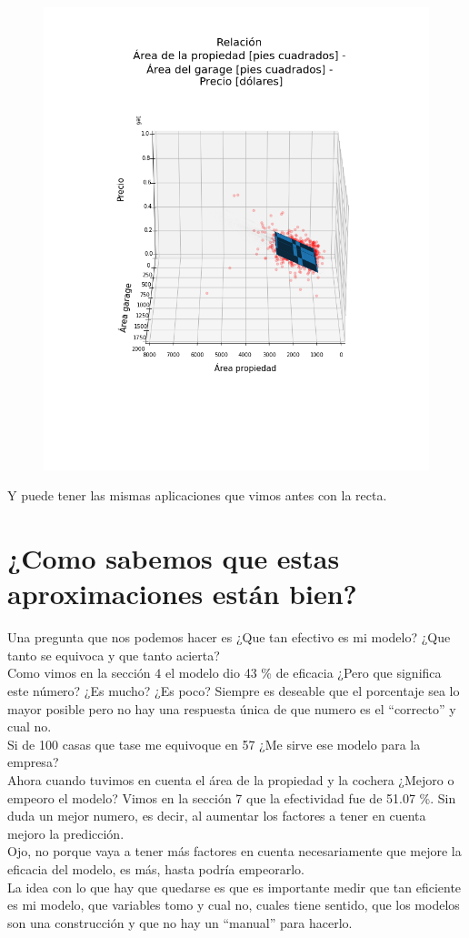 \documentclass{article}
\begin{document}
\begin{figure}[h!]
\includegraphics[scale=0.5]{Imagenes/plano_aproximacion.png}
\centering
\end{figure}
\newpage
Y puede tener las mismas aplicaciones que vimos antes con la recta.

\section{¿Como sabemos que estas aproximaciones están bien?}
Una pregunta que nos podemos hacer es ¿Que tan efectivo es mi modelo? ¿Que tanto se equivoca y que tanto acierta?\\
Como vimos en la sección $4$ el modelo dio 43 \% de eficacia ¿Pero que significa este número? ¿Es mucho? ¿Es poco? Siempre es deseable que el porcentaje sea lo mayor posible pero no hay una respuesta única de que numero es el ``correcto” y cual no.\\
Si de 100 casas que tase me equivoque en 57 ¿Me sirve ese modelo para la empresa?\\
Ahora cuando tuvimos en cuenta el área de la propiedad y la cochera ¿Mejoro o empeoro el modelo? Vimos en la sección 7 que la efectividad fue de 51.07 \%. Sin duda un mejor numero, es decir, al aumentar los factores a tener en cuenta mejoro la predicción.\\
Ojo, no porque vaya a tener más factores en cuenta necesariamente que mejore la eficacia del modelo, es más, hasta podría empeorarlo.\\
La idea con lo que hay que quedarse es que es importante medir que tan eficiente es mi modelo, que variables tomo y cual no, cuales tiene sentido, que los modelos son una construcción y que no hay un ``manual” para hacerlo.
\end{document}
